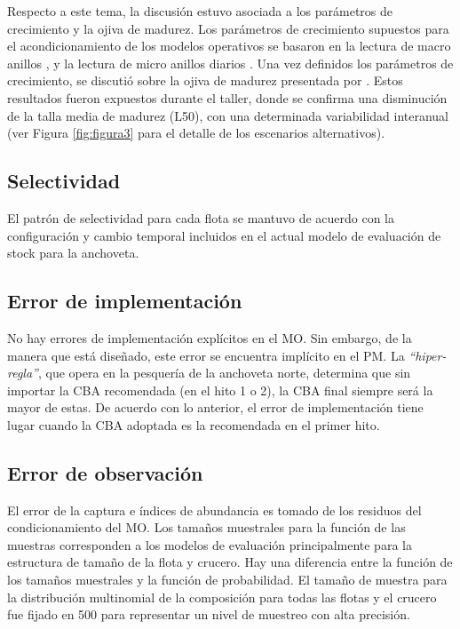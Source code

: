 Respecto a este tema, la discusión estuvo asociada a los parámetros de crecimiento y la ojiva de madurez. Los parámetros de crecimiento supuestos para el acondicionamiento de los modelos operativos se basaron en la lectura de macro anillos \citep{plaza2012}, y la lectura de micro anillos diarios \cite{cerna2016daily}. Una vez definidos los parámetros de crecimiento, se discutió sobre la ojiva de madurez presentada por \cite{Hernandez2023}. Estos resultados fueron expuestos durante el taller, donde se confirma una disminución de la talla media de madurez (L50), con una determinada variabilidad interanual (ver Figura \ref{fig:figura3} para el detalle de los escenarios alternativos). 

\subsection{Selectividad}

El patrón de selectividad para cada flota se mantuvo de acuerdo con la configuración y cambio temporal incluidos en el actual modelo de evaluación de stock para la anchoveta. 

\subsection{Error de implementación}

No hay errores de implementación explícitos en el MO. Sin embargo, de la manera que está diseñado, este error se encuentra implícito en el PM. La \textit{“hiper-regla”}, que opera en la pesquería de la anchoveta norte, determina que sin importar la CBA recomendada (en el hito 1 o 2), la CBA final siempre será la mayor de estas. De acuerdo con lo anterior, el error de implementación tiene lugar cuando la CBA adoptada es la recomendada en el primer hito.  

\subsection{Error de observación}

El error de la captura e índices de abundancia es tomado de los residuos del condicionamiento del MO. Los tamaños muestrales para la función de las muestras corresponden a los modelos de evaluación principalmente para la estructura de tamaño de la flota y crucero. Hay una diferencia entre la función de los tamaños muestrales y la función de probabilidad. El tamaño de muestra para la distribución multinomial de la composición para todas las flotas y el crucero fue fijado en 500 para representar un nivel de muestreo con alta precisión.
